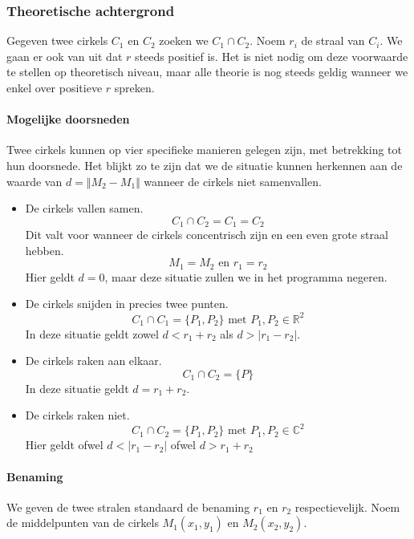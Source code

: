 \subsubsection{Theoretische achtergrond}
\begin{figure}[H]

\end{figure}
Gegeven twee cirkels $C_1$ en $C_2$ zoeken we $C_1 \cap C_2$. Noem $r_i$ de straal van $C_i$. We gaan er ook van uit dat $r$ steeds positief is. Het is niet nodig om deze voorwaarde te stellen op theoretisch niveau, maar alle theorie is nog steeds geldig wanneer we enkel over positieve $r$ spreken.
\paragraph{Mogelijke doorsneden}
Twee cirkels kunnen op vier specifieke manieren gelegen zijn, met betrekking tot hun doorsnede. Het blijkt zo te zijn dat we de situatie kunnen herkennen aan de waarde van $d=\Vert M_2-M_1\Vert$ wanneer de cirkels niet samenvallen.
\begin{itemize}
\item De cirkels vallen samen.\\
\[C_1 \cap C_2 = C_1 = C_2\]
Dit valt voor wanneer de cirkels concentrisch zijn en een even grote straal hebben.
\[
M_1 = M_2 \text{ en } r_1 = r_2
\]
Hier geldt $d = 0$, maar deze situatie zullen we in het programma negeren.

\item De cirkels snijden in precies twee punten.\\
\[C_1 \cap C_1 = \{P_1,P_2\} \text{ met } P_1,P_2 \in \mathbb{R}^2\]
In deze situatie geldt zowel $d < r_1+r_2$ als $ d > |r_1-r_2|$.

\item De cirkels raken aan elkaar.\\
\[C_1 \cap C_2 = \{P\}\]
In deze situatie geldt $d = r_1+r_2$.

\item De cirkels raken niet.
\[C_1 \cap C_2 = \{P_1,P_2\} \text{ met } P_1,P_2 \in \mathbb{C}^2\]
Hier geldt ofwel $d < |r_1-r_2|$ ofwel $d > r_1+r_2$
\end{itemize}

\paragraph{Benaming}
We geven de twee stralen standaard de benaming $r_1$ en $r_2$ respectievelijk.
Noem de middelpunten van de cirkels $M_1(x_1,y_1)$ en $M_2(x_2,y_2)$. 


